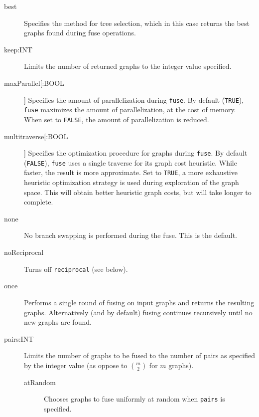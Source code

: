 	\begin{description}
	
		
		\item [best] Specifies the method for tree selection, which in this case returns the best 
		graphs found during fuse operations.		
		
		\item [keep:INT] Limits the number of returned graphs to the integer value specified. 
		
		\item[maxParallel[:BOOL]] Specifies the amount of parallelization during \texttt{fuse}. 
		By default (\texttt{TRUE}), \texttt{fuse} maximizes the amount of parallelization, at the
		cost of memory. When set to \texttt{FALSE}, the amount of parallelization is reduced. 
		
		\item[multitraverse[:BOOL ]] Specifies the optimization procedure for graphs during 
		\texttt{fuse}. By default (\texttt{FALSE}), \texttt{fuse} uses a single traverse for its graph 
		cost heuristic. While faster, the result is more approximate. Set to \texttt{TRUE}, a more 
		exhaustive heuristic optimization strategy is used during exploration of the graph space. 
		This will obtain better heuristic graph costs, but will take longer to complete.
		
		\item [none] No branch swapping is performed during the fuse. This is the default.
		
		\item [noReciprocal] Turns off \texttt{reciprocal} (see below).
		
		\item [once] Performs a single round of fusing on input graphs and returns the resulting 
		graphs. Alternatively (and by default) fusing continues recursively until no new graphs 
		are found.
		
		\item [pairs:INT] Limits the number of graphs to be fused to the number of pairs as 
		specified by the integer value (as oppose to $\binom{m}{2}$ for $m$ graphs).
		
		\begin{description}
			
			\item [atRandom] Chooses graphs to fuse uniformly at random when \texttt{pairs} is 
			specified. 
			

\end{description}
\end{description}

